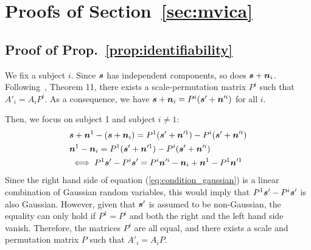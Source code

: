 \section{Proofs of Section~\ref{sec:mvica}}
\label{sec:app_proofs}
\subsection{Proof of Prop.~\ref{prop:identifiability}}
\label{app:proof:mvica:identifiability}
We fix a subject $i$. Since $\boldsymbol{s}$ has independent components, so does $\boldsymbol{s} + \boldsymbol{n}_i$. Following~\cite{comon1994independent},
Theorem 11, there exists a scale-permutation matrix $P^i$ such that $A'_i =
A_iP^i$. As a consequence, we have $\boldsymbol{s}  + \boldsymbol{n}_i = P^i(\boldsymbol{s}' + \boldsymbol{n}'^i)$ for all
$i$.

Then, we focus on subject 1 and subject $i \neq 1$:
\begin{align}
  &\boldsymbol{s} + \boldsymbol{n}^1 - (\boldsymbol{s} + \boldsymbol{n}_i) = P^1(\boldsymbol{s}' + \boldsymbol{n}'^1) - P^i(\boldsymbol{s}' + \boldsymbol{n}'^i)\\
  &\boldsymbol{n}^1 - \boldsymbol{n}_i = P^1(\boldsymbol{s}' + \boldsymbol{n}'^1) - P^i(\boldsymbol{s}' + \boldsymbol{n}'^i)\\
  &\iff P^1\boldsymbol{s}' - P^i\boldsymbol{s}' = P^i \boldsymbol{n}'^i - \boldsymbol{n}_i + \boldsymbol{n}^1 - P^1 \boldsymbol{n}'^1 \label{eq:condition_gaussian}
\end{align}
Since the right hand side of equation (\ref{eq:condition_gaussian}) is a linear combination of Gaussian random variables, this would imply that $P^1\boldsymbol{s}' - P^i\boldsymbol{s}'$ is also Gaussian. However, given that $\boldsymbol{s}'$ is assumed to be non-Gaussian, the equality can only hold if $P^1
= P^i$ and both the right and the left hand side vanish.
Therefore, the matrices $P^i$ are all equal, and there exists a scale and permutation matrix $P$ such that $A'_i = A_iP$.

